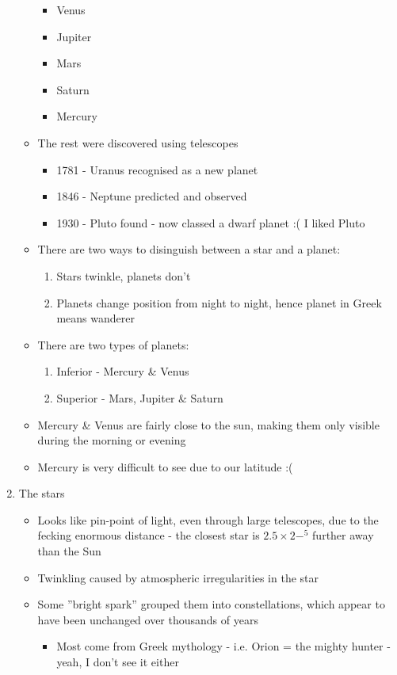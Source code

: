\documentclass[a4paper, 12pt]{article}
\begin{document}
\begin{enumerate}
\begin{itemize}
\begin{itemize}
		\item Venus
		\item Jupiter
		\item Mars
		\item Saturn
		\item Mercury
		\end{itemize}
	\item The rest were discovered using telescopes
		\begin{itemize}
		\item 1781 - Uranus recognised as a new planet
		\item 1846 - Neptune predicted and observed
		\item 1930 - Pluto found - now classed a dwarf planet :( I liked Pluto
		\end{itemize}
	\item There are two ways to disinguish between a star and a planet:
		\begin{enumerate}
		\item Stars twinkle, planets don't
		\item Planets change position from night to night, hence planet in Greek means wanderer
		\end{enumerate}
	\item There are two types of planets:
		\begin{enumerate}
		\item Inferior - Mercury \& Venus
		\item Superior - Mars, Jupiter \& Saturn
		\end{enumerate}
	\item Mercury \& Venus are fairly close to the sun, making them only visible during the morning or evening
	\item Mercury is very difficult to see due to our latitude :(
	\end{itemize}
\item The stars
	\begin{itemize}
	\item Looks like pin-point of light, even through large telescopes, due to the fecking enormous distance - the closest star is \(2.5\times2-^5\) further away than the Sun
	\item Twinkling caused by atmospheric irregularities in the star
	\item Some ''bright spark'' grouped them into constellations, which appear to have been unchanged over thousands of years
		\begin{itemize}
		\item Most come from Greek mythology - i.e. Orion = the mighty hunter - yeah, I don't see it either

\end{itemize}
\end{itemize}
\end{enumerate}
\end{document}
